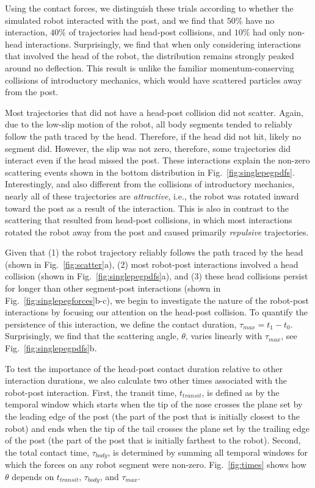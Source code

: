 \documentclass[aps,pre,twocolumn,superscriptaddress]{revtex4-1}
\begin{document}
Using the contact forces, we distinguish these trials according to whether the simulated robot interacted with the post, and we find that $50\%$ have no interaction, $40\%$ of trajectories had head-post collisions, and $10\%$ had only non-head interactions. Surprisingly, we find that when only considering interactions that involved the head of the robot, the distribution remains strongly peaked around no deflection. This result is unlike the familiar momentum-conserving collisions of introductory mechanics, which would have scattered particles away from the post.  

Most trajectories that did not have a head-post collision did not scatter. Again, due to the low-slip motion of the robot, all body segments tended to reliably follow the path traced by the head. Therefore, if the head did not hit, likely no segment did. However, the slip was not zero, therefore, some trajectories did interact even if the head missed the post. These interactions explain the non-zero scattering events shown in the bottom distribution in Fig.~\ref{fig:singlepegpdfs}. Interestingly, and also different from the collisions of introductory mechanics, nearly all of these trajectories are \emph{attractive}, i.e., the robot was rotated inward toward the post as a result of the interaction. This is also in contrast to the scattering that resulted from head-post collisions, in which most interactions rotated the robot away from the post and caused primarily \emph{repulsive} trajectories.

Given that (1) the robot trajectory reliably follows the path traced by the head (shown in Fig.~\ref{fig:scatter}a), (2) most robot-post interactions involved a head collision (shown in Fig.~\ref{fig:singlepegpdfs}a), and (3) these head collisions persist for longer than other segment-post interactions (shown in Fig.~\ref{fig:singlepegforces}b-c),  we begin to investigate the nature of the robot-post interactions by focusing our attention on the head-post collision.  To quantify the persistence of this interaction, we define the contact duration, $\tau_{max} = t_1 - t_0$. Surprisingly, we find that the scattering angle, $\theta$, varies linearly with $\tau_{max}$, see Fig.~\ref{fig:singlepegpdfs}b.  

To test the importance of the head-post contact duration relative to other interaction durations, we also calculate two other times associated with the robot-post interaction. First, the transit time, $t_{transit}$, is defined as by the temporal window which starts when the tip of the nose crosses the plane set by the leading edge of the post (the part of the post that is initially closest to the robot) and ends when the tip of the tail crosses the plane set by the trailing edge of the post (the part of the post that is initially farthest to the robot). Second, the total contact time, $\tau_{body}$, is determined by summing all temporal windows for which the forces on any robot segment were non-zero. Fig.~\ref{fig:times} shows how $\theta$ depends on $t_{transit}$, $\tau_{body}$, and $\tau_{max}$.  
\end{document}

